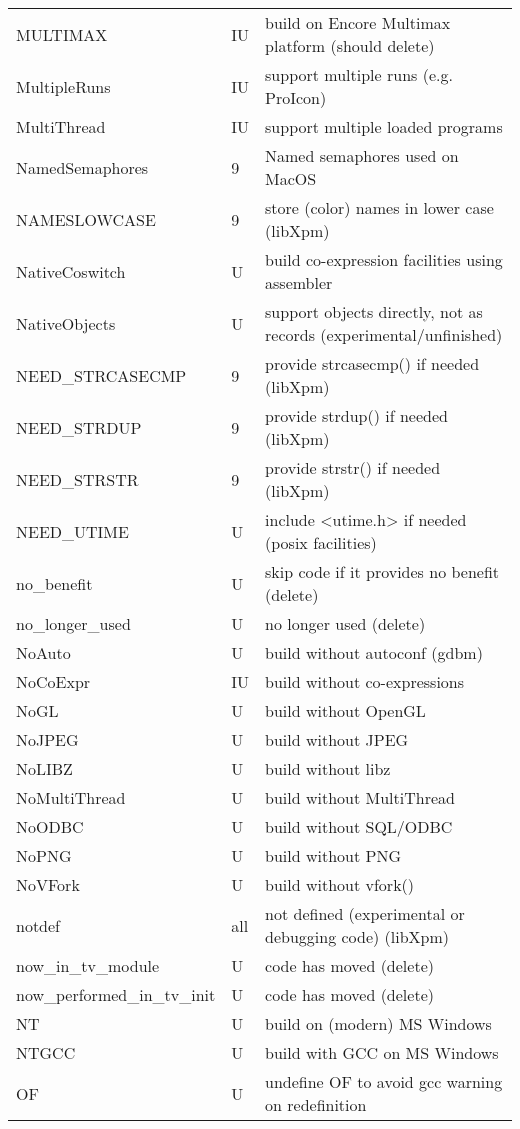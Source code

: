 \begin{xtabular}{|m{1.8in}|m{0.5in}|m{4.0in}|}
MULTIMAX & IU & build on Encore Multimax platform (should delete) \\
MultipleRuns & IU & support multiple runs (e.g. ProIcon) \\
MultiThread & IU & support multiple loaded programs \\
NamedSemaphores & 9 & Named semaphores used on MacOS \\
NAMESLOWCASE & 9 & store (color) names in lower case (libXpm) \\
NativeCoswitch & U & build co-expression facilities using assembler \\
NativeObjects & U & support objects directly, not as records (experimental/unfinished) \\
NEED\_STRCASECMP & 9 & provide strcasecmp() if needed (libXpm) \\
NEED\_STRDUP & 9 & provide strdup() if needed (libXpm) \\
NEED\_STRSTR & 9 & provide strstr() if needed (libXpm) \\
NEED\_UTIME & U & include <utime.h> if needed (posix facilities) \\
no\_benefit & U & skip code if it provides no benefit (delete) \\
no\_longer\_used & U & no longer used (delete) \\
NoAuto & U & build without autoconf (gdbm) \\
NoCoExpr & IU & build without co-expressions \\
NoGL & U & build without OpenGL \\
NoJPEG & U & build without JPEG \\
NoLIBZ & U & build without libz \\
NoMultiThread & U & build without MultiThread \\
NoODBC & U & build without SQL/ODBC \\
NoPNG & U & build without PNG \\
NoVFork & U & build without vfork() \\
notdef & all & not defined (experimental or debugging code) (libXpm) \\
now\_in\_tv\_module & U & code has moved (delete) \\
now\_performed\_in\_tv\_init & U & code has moved (delete) \\
NT & U & build on (modern) MS Windows \\
NTGCC & U & build with GCC on MS Windows \\
OF & U & undefine OF to avoid gcc warning on redefinition \\

\end{xtabular}
